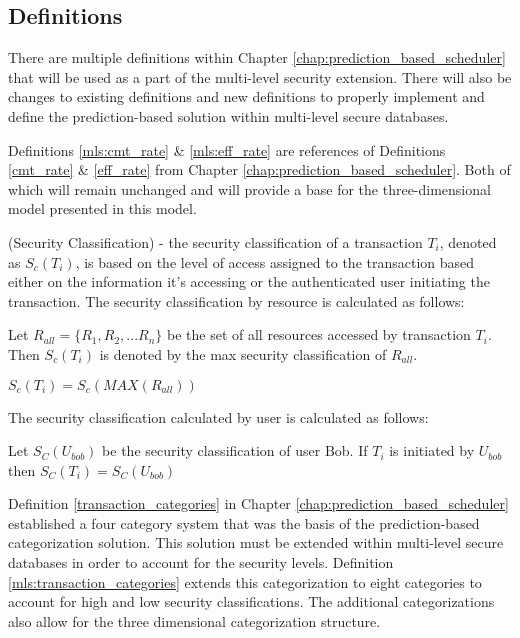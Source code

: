 \subsection{Definitions}
\label{mls:definitions}

There are multiple definitions within Chapter \ref{chap:prediction_based_scheduler} that will be used as a part of the multi-level security extension. There will also be changes to existing definitions and new definitions to properly implement and define the prediction-based solution within multi-level secure databases.

Definitions \ref{mls:cmt_rate} \& \ref{mls:eff_rate} are references of Definitions \ref{cmt_rate} \& \ref{eff_rate} from Chapter \ref{chap:prediction_based_scheduler}. Both of which will remain unchanged and will provide a base for the three-dimensional model presented in this model.

\begin{definition}
\label{mls:security_classification}
(Security Classification) - the security classification of a transaction $T_{i}$, denoted as  $S_{c}(T_{i})$, is based on the level of access assigned to the transaction based either on the information it's accessing or the authenticated user initiating the transaction. The security classification by resource is calculated as follows:

\begin{center}
Let $R_{all} = \{R_1, R_2,... R_n\}$ be the set of all resources accessed by transaction $T_i$. \newline
Then $S_c(T_i)$ is denoted by the max security classification of $R_{all}$.

$S_c(T_i) = S_c(MAX(R_{all}))$
\end{center}

The security classification calculated by user is calculated as follows:

\begin{center}
Let $S_C(U_{bob})$ be the security classification of user Bob.\newline 
If $T_i$ is initiated by $U_{bob}$ then $S_C(T_i) = S_C(U_{bob})$
\end{center}

\end{definition}


Definition \ref{transaction_categories} in Chapter \ref{chap:prediction_based_scheduler} established a four category system that was the basis of the prediction-based categorization solution. This solution must be extended within multi-level secure databases in order to account for the security levels. Definition \ref{mls:transaction_categories} extends this categorization to eight categories to account for high and low security classifications. The additional categorizations also allow for the three dimensional categorization structure.

